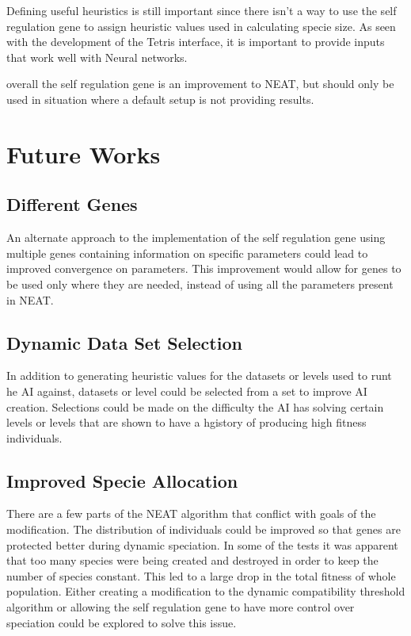 \documentclass[12pt]{ucthesis} \newif\ifpdf \ifx\pdfoutput\undefined
\begin{document}
Defining useful heuristics is still important since there isn’t a way to use the
self regulation gene to assign heuristic values used in calculating specie size.
As seen with the development of the Tetris interface, it is important to provide
inputs that work well with Neural networks.

overall the self regulation gene is an improvement to NEAT, but should only be
used in situation where a default setup is not providing results.

\section{Future Works}

\subsection{Different Genes}

An alternate approach to the implementation of the self regulation gene using
multiple genes containing information on specific parameters could lead to
improved convergence on parameters. This improvement would allow for genes to be
used only where they are needed, instead of using all the parameters present in
NEAT.
\subsection{Dynamic Data Set Selection}

In addition to generating heuristic values for the datasets or levels used to
runt he AI against, datasets or level could be selected from a set to improve AI
creation. Selections could be made on  the difficulty the AI has solving certain
levels or levels that are shown to have a hgistory of producing high fitness
individuals.
\subsection{Improved Specie Allocation}

There are a few parts of the NEAT algorithm that conflict with goals of the
modification. The distribution of individuals could be improved so that genes
are protected better during dynamic speciation. In some of the tests it was
apparent that too many species were being created and destroyed in order to keep
the number of species constant. This led to a large drop in the total fitness of
whole population. Either creating a modification to the dynamic compatibility
threshold algorithm or allowing the self regulation gene to have more control
over speciation could be explored to solve this issue.
\end{document}
